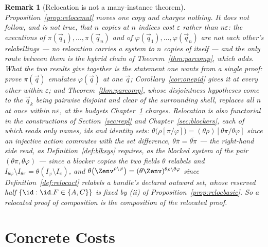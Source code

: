 \documentclass[10pt,oneside,openany]{book}
\theoremstyle{accentdef}
\newtheorem{remark}[definition]{Remark}
\theoremstyle{accentplain}
\begin{document}
\begin{remark}[Relocation is not a many-instance theorem]\label{rem:manyinstances}
Proposition~\ref{prop:relocemul} moves one copy and charges nothing. It does not follow, and is not
true, that $n$ copies at $n$ indices cost $\varepsilon$ rather than $n\varepsilon$: the executions
of $\pi(\vec q_1),\dots,\pi(\vec q_n)$ and of $\varphi(\vec q_1),\dots,\varphi(\vec q_n)$ are not
each other's relabellings --- no relocation carries a system to $n$ copies of itself --- and the only
route between them is the hybrid chain of
Theorem~\ref{thm:parcomp}, which adds. What the two results give together is the statement one
wants from a single proof: prove $\pi(\vec q)$ emulates $\varphi(\vec q)$ at one $\vec q$;
Corollary~\ref{cor:onepid} gives it at every other within $\varepsilon$; and
Theorem~\ref{thm:parcomp}, whose disjointness hypotheses come to the $\vec q_k$ being pairwise
disjoint and clear of the surrounding shell, replaces all $n$ at once within $n\varepsilon$, at the
budgets Chapter~\ref{app:conccosts} charges. Relocation is also functorial in the constructions of
Section~\ref{sec:repl} and Chapter~\ref{sec:blockers}, each of which reads only names, ids and
identity sets: $\theta\bigl(\rho[\pi/\varphi]\bigr) = (\theta\rho)[\theta\pi/\theta\varphi]$ since an
injective action commutes with the set difference, $\theta\overline{\pi} = \overline{\theta\pi}$ ---
the right-hand side read, as Definition~\ref{def:blksys} requires, as the blocked system of the pair
$(\theta\pi,\theta\varphi)$ --- since a blocker copies the two fields $\theta$ relabels and
$I_{\theta\varphi} \setminus I_{\theta\pi} = \theta(I_\varphi \setminus I_\pi)$, and
$\theta\bigl(\Zenv^{\rho \setminus \varphi}\bigr) = (\theta\Zenv)^{\theta\rho \setminus \theta\varphi}$
since Definition~\ref{def:relocact} relabels a bundle's declared outward set, whose reserved half
$\{\id : \id.F \in \{A,C\}\}$ is fixed by (ii) of Proposition~\ref{prop:relocbasic}. So a relocated
proof of composition is the composition of the relocated proof.
\end{remark}





\chapter{Concrete Costs}\label{app:conccosts}
\end{document}
